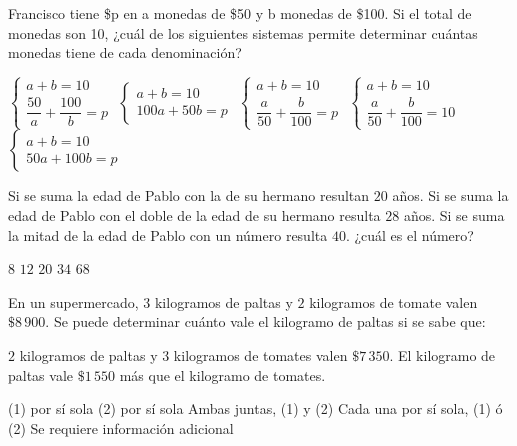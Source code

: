 \documentclass[sin nombre]{srs}
\begin{document}
\begin{preguntas}[after-item-skip=2cm]
\pregunta Francisco tiene \$p en a monedas de \$50 y b monedas de \$100. Si el total de monedas son 10, ¿cuál de los siguientes sistemas permite determinar cuántas monedas tiene de cada denominación?
\begin{vertical}
\alternativa $\begin{cases} a + b = 10 \\ \dfrac{50}{a} + \dfrac{100}{b} = p \end{cases}$
\alternativa $\begin{cases} a + b = 10 \\ 100a + 50b = p \end{cases}$
\alternativa $\begin{cases} a + b = 10 \\ \dfrac{a}{50} + \dfrac{b}{100} = p \end{cases}$
\alternativa $\begin{cases} a + b = 10 \\ \dfrac{a}{50} + \dfrac{b}{100} = 10 \end{cases}$
\alternativa $\begin{cases} a + b = 10 \\ 50a + 100b = p \end{cases}$
\end{vertical}

\pregunta Si se suma la edad de Pablo con la de su hermano resultan $20$ años. Si se suma la edad de Pablo con el doble de la edad de su hermano resulta $28$ años. Si se suma la mitad de la edad de Pablo con un número resulta $40$. ¿cuál es el número?
\begin{vertical}
\alternativa $8$
\alternativa $12$
\alternativa $20$
\alternativa $34$
\alternativa $68$
\end{vertical}

\pregunta En un supermercado, $3$ kilogramos de paltas y $2$ kilogramos de tomate valen $\$8\,900$. Se puede determinar cuánto vale el kilogramo de paltas si se sabe que:
\begin{verticaln}
\alternativa $2$ kilogramos de paltas y $3$ kilogramos de tomates valen $\$7\,350$.
\alternativa El kilogramo de paltas vale $\$1\,550$ más que el kilogramo de tomates.
\end{verticaln}
\begin{vertical}
\alternativa (1) por sí sola
\alternativa (2) por sí sola
\alternativa Ambas juntas, (1) y (2)
\alternativa Cada una por sí sola, (1) ó (2)
\alternativa Se requiere información adicional
\end{vertical}


\end{preguntas}
\end{document}
